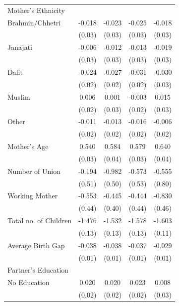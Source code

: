 \begin{longtable}{l*{4}{c}}
\multicolumn{5}{l}{Mother's Ethnicity} \\
\hspace{1em}Brahmin/Chhetri & -0.018 & -0.023 & -0.025 & -0.018 \\
                    & (0.03) & (0.03) & (0.03) & (0.03) \\
\hspace{1em}Janajati & -0.006 & -0.012 & -0.013 & -0.019 \\
                    & (0.03) & (0.03) & (0.03) & (0.03) \\
\hspace{1em}Dalit & -0.024 & -0.027 & -0.031 & -0.030 \\
                    & (0.02) & (0.02) & (0.02) & (0.03) \\
\hspace{1em}Muslim & 0.006 & 0.001 & -0.003 & 0.015 \\
                    & (0.02) & (0.03) & (0.02) & (0.03) \\
\hspace{1em}Other & -0.011 & -0.013 & -0.016 & -0.006 \\
                    & (0.02) & (0.02) & (0.02) & (0.02) \\
Mother's Age & 0.540\sym{***} & 0.584\sym{***} & 0.579\sym{***} & 0.640\sym{***} \\
                    & (0.03) & (0.04) & (0.03) & (0.04) \\
Number of Union & -0.194 & -0.982\sym{*} & -0.573 & -0.555 \\
                    & (0.51) & (0.50) & (0.53) & (0.80) \\
Working Mother & -0.553 & -0.445 & -0.444 & -0.830\sym{*} \\
                    & (0.44) & (0.40) & (0.44) & (0.46) \\
Total no. of Children & -1.476\sym{***} & -1.532\sym{***} & -1.578\sym{***} & -1.603\sym{***} \\
                    & (0.13) & (0.13) & (0.13) & (0.11) \\
Average Birth Gap & -0.038\sym{***} & -0.038\sym{***} & -0.037\sym{***} & -0.029\sym{***} \\
                    & (0.01) & (0.01) & (0.01) & (0.01) \\
\multicolumn{5}{l}{Partner's Education} \\
\hspace{1em}No Education & 0.020 & 0.020 & 0.023 & 0.008 \\
                    & (0.02) & (0.02) & (0.02) & (0.03) \\

\end{longtable}
